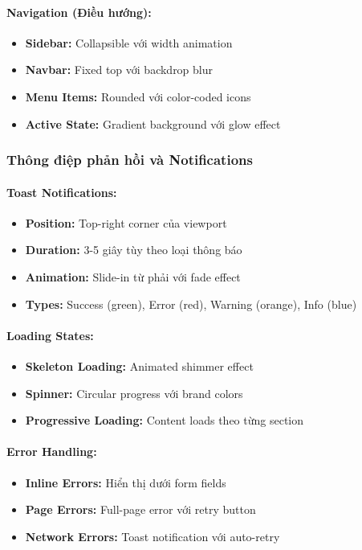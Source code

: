 \paragraph{Navigation (Điều hướng):}
\begin{itemize}
    \item \textbf{Sidebar:} Collapsible với width animation
    \item \textbf{Navbar:} Fixed top với backdrop blur
    \item \textbf{Menu Items:} Rounded với color-coded icons
    \item \textbf{Active State:} Gradient background với glow effect
\end{itemize}

\subsubsection{Thông điệp phản hồi và Notifications}

\paragraph{Toast Notifications:}
\begin{itemize}
    \item \textbf{Position:} Top-right corner của viewport
    \item \textbf{Duration:} 3-5 giây tùy theo loại thông báo
    \item \textbf{Animation:} Slide-in từ phải với fade effect
    \item \textbf{Types:} Success (green), Error (red), Warning (orange), Info (blue)
\end{itemize}

\paragraph{Loading States:}
\begin{itemize}
    \item \textbf{Skeleton Loading:} Animated shimmer effect
    \item \textbf{Spinner:} Circular progress với brand colors
    \item \textbf{Progressive Loading:} Content loads theo từng section
\end{itemize}

\paragraph{Error Handling:}
\begin{itemize}
    \item \textbf{Inline Errors:} Hiển thị dưới form fields
    \item \textbf{Page Errors:} Full-page error với retry button
    \item \textbf{Network Errors:} Toast notification với auto-retry
\end{itemize}

